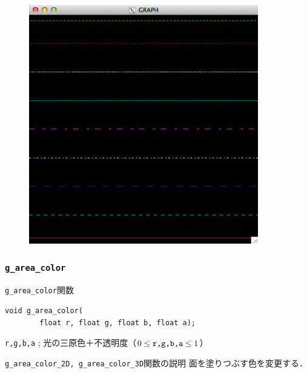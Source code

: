 \documentclass[platex,a4paper,12pt]{jsarticle}%
\begin{document}
\begin{figure}[htb]
\centering
\includegraphics[width=100mm]{Canvas_g_line.eps}
\end{figure}





\clearpage
\subsubsection{\texttt{g\_area\_color}}

\begin{itembox}[l]{\texttt{g\_area\_color}関数}
\begin{verbatim}
void g_area_color(
        float r, float g, float b, float a);
\end{verbatim}
\verb|r,g,b,a| ; 光の三原色＋不透明度（$0\leq \verb|r,g,b,a| \leq 1$）
\end{itembox}

\begin{itembox}[l]{\texttt{g\_area\_color\_2D, g\_area\_color\_3D}関数の説明}
面を塗りつぶす色を変更する．
\end{itembox}
\end{document}
